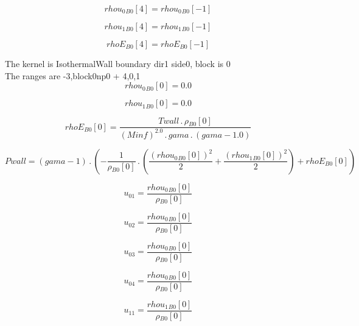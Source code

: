 \documentclass{article}
\begin{document}
\begin{dmath}{rhou_{0}{_{B0}}}[{4}] = {rhou_{0}{_{B0}}}[{-1}]\end{dmath}

\begin{dmath}{rhou_{1}{_{B0}}}[{4}] = {rhou_{1}{_{B0}}}[{-1}]\end{dmath}

\begin{dmath}{rhoE{_{B0}}}[{4}] = {rhoE{_{B0}}}[{-1}]\end{dmath}

\noindent The kernel is IsothermalWall boundary dir1 side0, block is 0\\\noindent The ranges are -3,block0np0 + 4,0,1\\\begin{dmath}{rhou_{0}{_{B0}}}[{0}] = 0.0\end{dmath}

\begin{dmath}{rhou_{1}{_{B0}}}[{0}] = 0.0\end{dmath}

\begin{dmath}{rhoE{_{B0}}}[{0}] = \frac{Twall \,.\, {\rho{_{B0}}}[{0}]}{\left(Minf \right)^{2.0} \,.\, gama \,.\, \left(gama - 1.0\right)}\end{dmath}

\begin{dmath}Pwall = \left(gama - 1\right) \,.\, \left(- \frac{1}{{\rho{_{B0}}}[{0}]} \,.\, \left(\frac{\left({rhou_{0}{_{B0}}}[{0}] \right)^{2}}{2} + \frac{\left({rhou_{1}{_{B0}}}[{0}] \right)^{2}}{2}\right) + {rhoE{_{B0}}}[{0}]\right)\end{dmath}

\begin{dmath}u_{01} = \frac{{rhou_{0}{_{B0}}}[{0}]}{{\rho{_{B0}}}[{0}]}\end{dmath}

\begin{dmath}u_{02} = \frac{{rhou_{0}{_{B0}}}[{0}]}{{\rho{_{B0}}}[{0}]}\end{dmath}

\begin{dmath}u_{03} = \frac{{rhou_{0}{_{B0}}}[{0}]}{{\rho{_{B0}}}[{0}]}\end{dmath}

\begin{dmath}u_{04} = \frac{{rhou_{0}{_{B0}}}[{0}]}{{\rho{_{B0}}}[{0}]}\end{dmath}

\begin{dmath}u_{11} = \frac{{rhou_{1}{_{B0}}}[{0}]}{{\rho{_{B0}}}[{0}]}\end{dmath}
\end{document}
